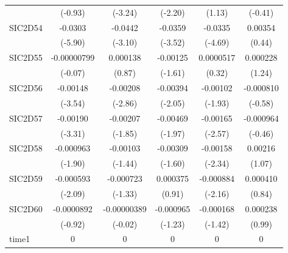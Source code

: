 \begin{table}[htbp]
\begin{tabular}{l*{5}{c}}
            &     (-0.93)         &     (-3.24)         &     (-2.20)         &      (1.13)         &     (-0.41)         \\
SIC2D54     &     -0.0303\sym{***}&     -0.0442\sym{**} &     -0.0359\sym{***}&     -0.0335\sym{***}&     0.00354         \\
            &     (-5.90)         &     (-3.10)         &     (-3.52)         &     (-4.69)         &      (0.44)         \\
SIC2D55     & -0.00000799         &    0.000138         &    -0.00125         &   0.0000517         &    0.000228         \\
            &     (-0.07)         &      (0.87)         &     (-1.61)         &      (0.32)         &      (1.24)         \\
SIC2D56     &    -0.00148\sym{***}&    -0.00208\sym{**} &    -0.00394\sym{*}  &    -0.00102         &   -0.000810         \\
            &     (-3.54)         &     (-2.86)         &     (-2.05)         &     (-1.93)         &     (-0.58)         \\
SIC2D57     &    -0.00190\sym{***}&    -0.00207         &    -0.00469\sym{*}  &    -0.00165\sym{*}  &   -0.000964         \\
            &     (-3.31)         &     (-1.85)         &     (-1.97)         &     (-2.57)         &     (-0.46)         \\
SIC2D58     &   -0.000963         &    -0.00103         &    -0.00309         &    -0.00158\sym{*}  &     0.00216         \\
            &     (-1.90)         &     (-1.44)         &     (-1.60)         &     (-2.34)         &      (1.07)         \\
SIC2D59     &   -0.000593\sym{*}  &   -0.000723         &    0.000375         &   -0.000884\sym{*}  &    0.000410         \\
            &     (-2.09)         &     (-1.33)         &      (0.91)         &     (-2.16)         &      (0.84)         \\
SIC2D60     &  -0.0000892         & -0.00000389         &   -0.000965         &   -0.000168         &    0.000238         \\
            &     (-0.92)         &     (-0.02)         &     (-1.23)         &     (-1.42)         &      (0.99)         \\
time1       &           0         &           0         &           0         &           0         &           0         \\

\end{tabular}
\end{table}
